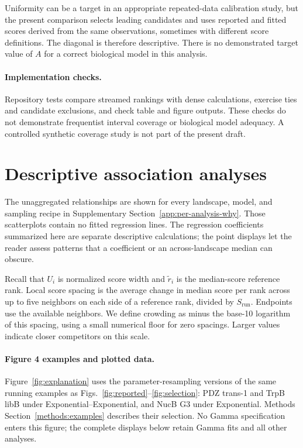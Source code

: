 Uniformity can be a target in an appropriate repeated-data calibration
study, but the present comparison selects leading candidates and uses
reported and fitted scores derived from the same observations, sometimes
with different score definitions. The diagonal is therefore descriptive.
There is no demonstrated target value of $A$ for a correct biological model
in this analysis.

\paragraph{Implementation checks.}
Repository tests compare streamed rankings with dense calculations,
exercise ties and candidate exclusions, and check table and figure
outputs. These checks do not demonstrate frequentist interval coverage
or biological model adequacy. A controlled synthetic coverage study
is not part of the present draft.

\section{Descriptive association analyses}
\label{app:associations}

The unaggregated relationships are shown for every landscape, model,
and sampling recipe in Supplementary Section~\ref{app:per-analysis-why}.
Those scatterplots contain no fitted regression lines. The regression
coefficients summarized here are separate descriptive calculations;
the point displays let the reader assess patterns that a coefficient
or an across-landscape median can obscure.

Recall that $U_i$ is normalized score width and $\widetilde r_i$ is the
median-score reference rank. Local score spacing is the average change in
median score per rank across up to five neighbors on each side of a
reference rank, divided by $S_{\mathrm{run}}$. Endpoints use the available
neighbors. We define crowding as minus the base-10 logarithm of this
spacing, using a small numerical floor for zero spacings. Larger values
indicate closer competitors on this scale.

\paragraph{Figure 4 examples and plotted data.}
\label{app:figure-explanation}
Figure~\ref{fig:explanation} uses the parameter-resampling versions of
the same running examples as Figs.~\ref{fig:reported}--\ref{fig:selection}:
PDZ trans-1 and TrpB libB under Exponential--Exponential,
and NucB G3 under Exponential. Methods Section~\ref{methods:examples}
describes their selection. No Gamma specification enters this figure;
the complete displays below retain Gamma fits and all other analyses.

